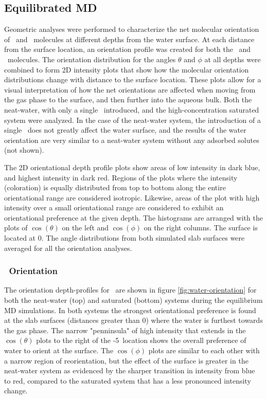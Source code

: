 \subsection{Equilibrated MD}

Geometric analyses were performed to characterize the net molecular orientation of \wat~and \suldiox~molecules at different depths from the water surface. At each distance from the surface location, an orientation profile was created for both the \wat~and \suldiox~molecules. The orientation distribution for the angles $\theta$ and $\phi$ at all depths were combined to form 2D intensity plots that show how the molecular orientation distributions change with distance to the surface location. These plots allow for a visual interpretation of how the net orientations are affected when moving from the gas phase to the surface, and then further into the aqueous bulk. Both the neat-water, with only a single \suldiox~introduced, and the high-concentration saturated system were analyzed. In the case of the neat-water system, the introduction of a single \suldiox~does not greatly affect the water surface, and the results of the water orientation are very similar to a neat-water system without any adsorbed solutes (not shown).

The 2D orientational depth profile plots show areas of low intensity in dark blue, and highest intensity in dark red. Regions of the plots where the intensity (coloration) is equally distributed from top to bottom along the entire orientational range are considered isotropic. Likewise, areas of the plot with high intensity over a small orientational range are considered to exhibit an orientational preference at the given depth.  The histograms are arranged with the plots of $\cos(\theta)$ on the left and $\cos(\phi)$ on the right columns. The surface is located at 0\angs. The angle distributions from both simulated slab surfaces were averaged for all the orientation analyses.

\subsubsection{\wat~Orientation}

The orientation depth-profiles for \wat~are shown in figure \ref{fig:water-orientation} for both the neat-water (top) and saturated (bottom) systems during the equilibrium MD simulations. In both systems the strongest orientational preference is found at the slab surfaces (distances greater than 0\angs) where the water is furthest towards the gas phase. The narrow "penninsula" of high intensity that extends in the $\cos(\theta)$ plots to the right of the -5\angs~location shows the overall preference of water to orient at the surface. The $\cos(\phi)$ plots are similar to each other with a narrow region of reorientation, but the effect of the surface is greater in the neat-water system as evidenced by the sharper transition in intensity from blue to red, compared to the saturated system that has a less pronounced intensity change.


